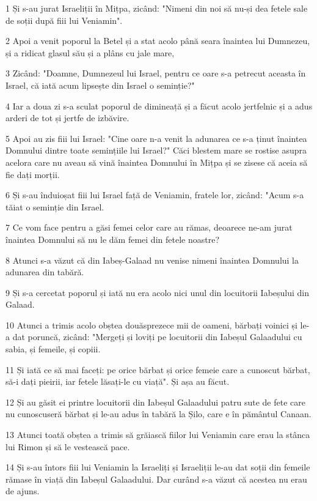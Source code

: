 \par 1 Și s-au jurat Israeliții în Mițpa, zicând: "Nimeni din noi să nu-și dea fetele sale de soții după fiii lui Veniamin".
\par 2 Apoi a venit poporul la Betel și a stat acolo până seara înaintea lui Dumnezeu, și a ridicat glasul său și a plâns cu jale mare,
\par 3 Zicând: "Doamne, Dumnezeul lui Israel, pentru ce oare s-a petrecut aceasta în Israel, că iată acum lipsește din Israel o seminție?"
\par 4 Iar a doua zi s-a sculat poporul de dimineață și a făcut acolo jertfelnic și a adus arderi de tot și jertfe de izbăvire.
\par 5 Apoi au zis fiii lui Israel: "Cine oare n-a venit la adunarea ce s-a ținut înaintea Domnului dintre toate semințiile lui Israel?" Căci blestem mare se rostise asupra acelora care nu aveau să vină înaintea Domnului în Mițpa și se zisese că aceia să fie dați morții.
\par 6 Și s-au înduioșat fiii lui Israel față de Veniamin, fratele lor, zicând: "Acum s-a tăiat o seminție din Israel.
\par 7 Ce vom face pentru a găsi femei celor care au rămas, deoarece ne-am jurat înaintea Domnului să nu le dăm femei din fetele noastre?
\par 8 Atunci s-a văzut că din Iabeș-Galaad nu venise nimeni înaintea Domnului la adunarea din tabără.
\par 9 Și s-a cercetat poporul și iată nu era acolo nici unul din locuitorii Iabeșului din Galaad.
\par 10 Atunci a trimis acolo obștea douăsprezece mii de oameni, bărbați voinici și le-a dat poruncă, zicând: "Mergeți și loviți pe locuitorii din Iabeșul Galaadului cu sabia, și femeile, și copiii.
\par 11 Și iată ce să mai faceți: pe orice bărbat și orice femeie care a cunoscut bărbat, să-i dați pieirii, iar fetele lăsați-le cu viață". Și așa au făcut.
\par 12 Și au găsit ei printre locuitorii din Iabeșul Galaadului patru sute de fete care nu cunoscuseră bărbat și le-au adus în tabără la Șilo, care e în pământul Canaan.
\par 13 Atunci toată obștea a trimis să grăiască fiilor lui Veniamin care erau la stânca lui Rimon și să le vestească pace.
\par 14 Și s-au întors fiii lui Veniamin la Israeliți și Israeliții le-au dat soții din femeile rămase în viață din Iabeșul Galaadului. Dar curând s-a văzut că acestea nu erau de ajuns.
